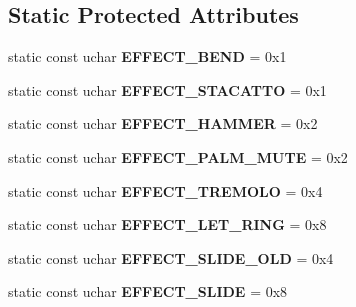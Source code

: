 \subsection*{Static Protected Attributes}
\begin{DoxyCompactItemize}
\item 
\mbox{\label{class_ms_1_1_guitar_pro_a21725e774180d6e284d42180da5d54a6}} 
static const uchar {\bfseries E\+F\+F\+E\+C\+T\+\_\+\+B\+E\+ND} = 0x1
\item 
\mbox{\label{class_ms_1_1_guitar_pro_ac96a282a2aacb9dfed79700b7afa09fb}} 
static const uchar {\bfseries E\+F\+F\+E\+C\+T\+\_\+\+S\+T\+A\+C\+A\+T\+TO} = 0x1
\item 
\mbox{\label{class_ms_1_1_guitar_pro_a160e2596029b7c2e48e994e3d8653cd3}} 
static const uchar {\bfseries E\+F\+F\+E\+C\+T\+\_\+\+H\+A\+M\+M\+ER} = 0x2
\item 
\mbox{\label{class_ms_1_1_guitar_pro_a1997a56bfb558d498b865fe60b6fb144}} 
static const uchar {\bfseries E\+F\+F\+E\+C\+T\+\_\+\+P\+A\+L\+M\+\_\+\+M\+U\+TE} = 0x2
\item 
\mbox{\label{class_ms_1_1_guitar_pro_ab3ebe1e44738583c0f58506a0263144a}} 
static const uchar {\bfseries E\+F\+F\+E\+C\+T\+\_\+\+T\+R\+E\+M\+O\+LO} = 0x4
\item 
\mbox{\label{class_ms_1_1_guitar_pro_a538f89836372c59b07d2c0a10fdeb6e6}} 
static const uchar {\bfseries E\+F\+F\+E\+C\+T\+\_\+\+L\+E\+T\+\_\+\+R\+I\+NG} = 0x8
\item 
\mbox{\label{class_ms_1_1_guitar_pro_a4b53ebfecd5971d2de24c5a479661927}} 
static const uchar {\bfseries E\+F\+F\+E\+C\+T\+\_\+\+S\+L\+I\+D\+E\+\_\+\+O\+LD} = 0x4
\item 
\mbox{\label{class_ms_1_1_guitar_pro_aef70d548e40e6a430ec32b3d108346fa}} 
static const uchar {\bfseries E\+F\+F\+E\+C\+T\+\_\+\+S\+L\+I\+DE} = 0x8
\item 
\mbox{\label{class_ms_1_1_guitar_pro_a4ac9e5f0691bca74c1c35f91a31a2ad2}} 

\end{DoxyCompactItemize}
